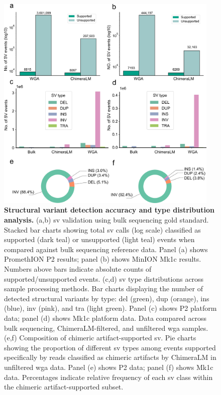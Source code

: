 \documentclass[pdflatex,sn-nature]{sn-jnl}%
\theoremstyle{thmstyleone}%
\theoremstyle{thmstyletwo}%
\theoremstyle{thmstylethree}%
\begin{document}
\begin{figure}[!ht]
	\begin{center}
		\includegraphics[width=0.95\textwidth]{final_figures/figure3}
	\end{center}
	\caption{{\bf Structural variant detection accuracy and type distribution analysis.}
		(a,b) \gls{sv} validation using bulk sequencing gold standard. Stacked bar charts showing total \gls{sv} calls (log scale) classified as supported (dark teal) or unsupported (light teal) events when compared against bulk sequencing reference data. Panel (a) shows PromethION P2 results; panel (b) shows MinION Mk1c results. Numbers above bars indicate absolute counts of supported/unsupported events.
		(c,d) \gls{sv} type distributions across sample processing methods. Bar charts displaying the number of detected structural variants by type: \gls{del} (green), \gls{dup} (orange), \gls{ins} (blue), \gls{inv} (pink), and \gls{tra} (light green). Panel (c) shows P2 platform data; panel (d) shows Mk1c platform data. Data compared across bulk sequencing, ChimeraLM-filtered, and unfiltered \gls{wga} samples.
		(e,f) Composition of chimeric artifact-supported \gls{sv}. Pie charts showing the proportion of different \gls{sv} types among events supported specifically by reads classified as chimeric artifacts by ChimeraLM in unfiltered \gls{wga} data. Panel (e) shows P2 data; panel (f) shows Mk1c data. Percentages indicate relative frequency of each \gls{sv} class within the chimeric artifact-supported subset.
	}\label{fig:figure3}
\end{figure}
\end{document}
